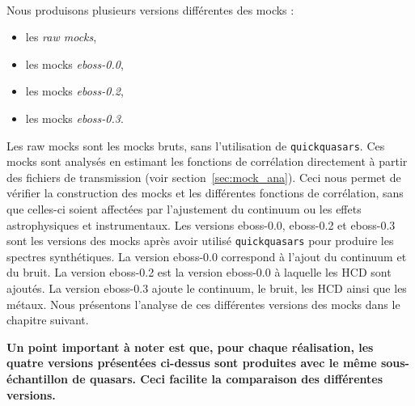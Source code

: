 \paragraph{}
Nous produisons plusieurs versions différentes des mocks :
\begin{itemize}
\item les \emph{raw mocks},
\item les mocks \emph{eboss-0.0}, 
\item les mocks \emph{eboss-0.2},
\item les mocks \emph{eboss-0.3}.
\end{itemize}
Les raw mocks sont les mocks bruts, sans l'utilisation de \texttt{quickquasars}. Ces mocks sont analysés en estimant les fonctions de corrélation directement à partir des fichiers de transmission (voir section~\ref{sec:mock_ana}). Ceci nous permet de vérifier la construction des mocks et les différentes fonctions de corrélation, sans que celles-ci soient affectées par l'ajustement du continuum ou les effets astrophysiques et instrumentaux.
Les versions eboss-0.0, eboss-0.2 et eboss-0.3 sont les versions des mocks après avoir utilisé \texttt{quickquasars} pour produire les spectres synthétiques. La version eboss-0.0 correspond à l'ajout du continuum et du bruit. La version eboss-0.2 est la version eboss-0.0 à laquelle les HCD sont ajoutés. La version eboss-0.3 ajoute le continuum, le bruit, les HCD ainsi que les métaux.
Nous présentons l'analyse de ces différentes versions des mocks dans le chapitre suivant.

\textbf{Un point important à noter est que, pour chaque réalisation, les quatre versions présentées ci-dessus sont produites avec le même sous-échantillon de quasars. Ceci facilite la comparaison des différentes versions.}



% 
% 
